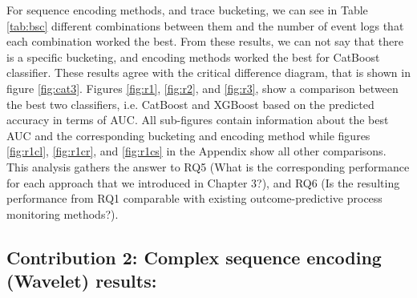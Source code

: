 For sequence encoding methods, and trace bucketing, we can see in Table \ref{tab:bsc}  different combinations between them and the number of event logs that each combination worked the best. From these results, we can not say that there is a specific bucketing, and encoding methods worked the best for CatBoost classifier. These results agree with the critical difference diagram, that is shown in figure \ref{fig:cat3}. Figures \ref{fig:r1}, \ref{fig:r2}, and \ref{fig:r3}, show a comparison between the best two classifiers, i.e. CatBoost and XGBoost based on the predicted accuracy in terms of AUC.  All sub-figures contain information about the best AUC and the corresponding bucketing and encoding method while figures \ref{fig:r1cl}, \ref{fig:r1cr}, and \ref{fig:r1cs} in the Appendix show all other comparisons. This analysis gathers the answer to RQ5 (What is the corresponding performance for each approach that we introduced in Chapter 3?), and RQ6 (Is the resulting performance from RQ1 comparable with existing outcome-predictive process monitoring methods?).












	

		

                                                         



\clearpage
\subsection{Contribution 2: Complex sequence encoding (Wavelet) results:} \label{wresults}


